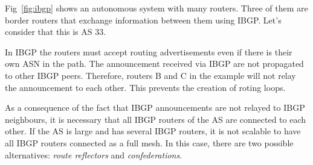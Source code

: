Fig~\ref{fig:ibgp} shows an autonomous system with many routers. 
Three of them are border routers that exchange information between them using IBGP.
Let's consider that this is AS 33.

In IBGP the routers must accept routing advertisements even if there is their own ASN in the path.
The announcement received via IBGP are not propagated to other IBGP peers.
Therefore, routers B and C in the example will not relay the announcement to each other.
This prevents the creation of roting loops.

As a consequence of the fact that IBGP announcements are not relayed to IBGP neighbours, it is necessary that all IBGP routers of the AS are connected to each other.
If the AS is large and has several IBGP routers, it is not scalable to have all IBGP routers connected as a full mesh.
In this case, there are two possible alternatives: \emph{route reflectors} and \emph{confederations}.

